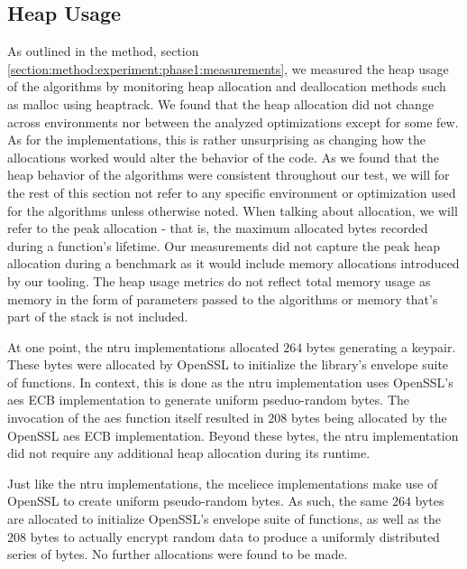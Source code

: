 \subsection{Heap Usage}

As outlined in the method, section \ref{section:method:experiment:phase1:measurements}, we measured the heap usage of the algorithms by monitoring heap allocation and deallocation methods such as malloc using heaptrack. We found that the heap allocation did not change across environments nor between the analyzed optimizations except for some few. As for the implementations, this is rather unsurprising as changing how the allocations worked would alter the behavior of the code. As we found that the heap behavior of the algorithms were consistent throughout our test, we will for the rest of this section not refer to any specific environment or optimization used for the algorithms unless otherwise noted. When talking about allocation, we will refer to the peak allocation - that is, the maximum allocated bytes recorded during a function's lifetime. Our measurements did not capture the peak heap allocation during a benchmark as it would include memory allocations introduced by our tooling. The heap usage metrics do not reflect total memory usage as memory in the form of parameters passed to the algorithms or memory that's part of the stack is not included.

At one point, the \gls{ntru} implementations allocated $264$ bytes generating a keypair. These bytes were allocated by OpenSSL to initialize the library's envelope suite of functions. In context, this is done as the \gls{ntru} implementation uses OpenSSL's \gls{aes} ECB implementation to generate uniform pseduo-random bytes. The invocation of the \gls{aes} function itself resulted in $208$ bytes being allocated by the OpenSSL \gls{aes} ECB implementation. Beyond these bytes, the \gls{ntru} implementation did not require any additional heap allocation during its runtime.

Just like the \gls{ntru} implementations, the \gls{mceliece} implementations make use of OpenSSL to create uniform pseudo-random bytes. As such, the same $264$ bytes are allocated to initialize OpenSSL's envelope suite of functions, as well as the $208$ bytes to actually encrypt random data to produce a uniformly distributed series of bytes. No further allocations were found to be made.

